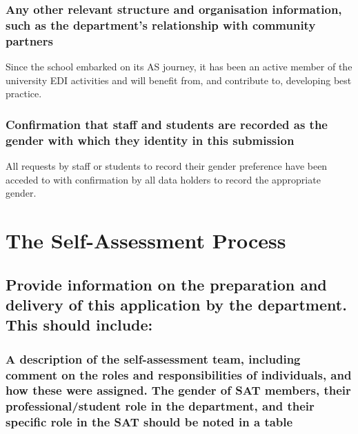 \subsubsection{Any other relevant structure and organisation information, such as the department’s relationship with community partners}

Since the school embarked on its AS journey, it has been an active member of the university EDI activities and will benefit from, and contribute to, developing best practice.


\subsubsection{Confirmation that staff and students are recorded as the gender with which they identity in this submission}

All requests by staff or students to record their gender preference have been acceded to with confirmation by all data holders to record the appropriate gender.  

\clearpage 
\section{The Self-Assessment Process}


\subsection{Provide information on the preparation and delivery of this application by the department. This should include:}


\subsubsection{A description of the self-assessment team, including comment on the roles and responsibilities of individuals, and how these were assigned. The gender of SAT members, their professional/student role in the department, and their specific role in the SAT should be noted in a table}

